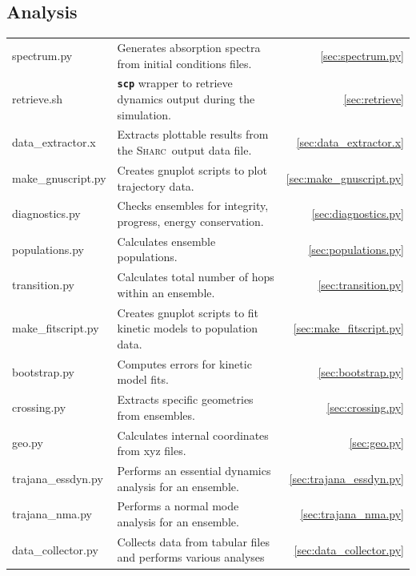 \documentclass[a4paper,10pt,DIV=15,openany,twoside=false]{scrbook}
\newcommand{\sharc}{\textsc{Sharc}}
\newcommand{\ttt}[1]{\textbf{\texttt{#1}}}
\begin{document}
\subsection{Analysis}

\begin{tabular}{>{\ttfamily}lp{10.5cm}r}
  spectrum.py           &Generates absorption spectra from initial conditions files.            &\ref{sec:spectrum.py}\\
  retrieve.sh           &\ttt{scp} wrapper to retrieve dynamics output during the simulation.   &\ref{sec:retrieve}\\
  data\_extractor.x     &Extracts plottable results from the \sharc\ output data file.          &\ref{sec:data_extractor.x}\\
  make\_gnuscript.py    &Creates gnuplot scripts to plot trajectory data.                       &\ref{sec:make_gnuscript.py}\\
  diagnostics.py        &Checks ensembles for integrity, progress, energy conservation.         &\ref{sec:diagnostics.py}\\
  populations.py        &Calculates ensemble populations.                                       &\ref{sec:populations.py}\\
  transition.py         &Calculates total number of hops within an ensemble.                    &\ref{sec:transition.py}\\
  make\_fitscript.py    &Creates gnuplot scripts to fit kinetic models to population data.      &\ref{sec:make_fitscript.py}\\
  bootstrap.py          &Computes errors for kinetic model fits.                                &\ref{sec:bootstrap.py}\\
  crossing.py           &Extracts specific geometries from ensembles.                           &\ref{sec:crossing.py}\\
  geo.py                &Calculates internal coordinates from xyz files.                        &\ref{sec:geo.py}\\
  trajana\_essdyn.py    &Performs an essential dynamics analysis for an ensemble.               &\ref{sec:trajana_essdyn.py}\\
  trajana\_nma.py       &Performs a normal mode analysis for an ensemble.                       &\ref{sec:trajana_nma.py}\\
  data\_collector.py    &Collects data from tabular files and performs various analyses         &\ref{sec:data_collector.py}\\
\end{tabular}
\end{document}
